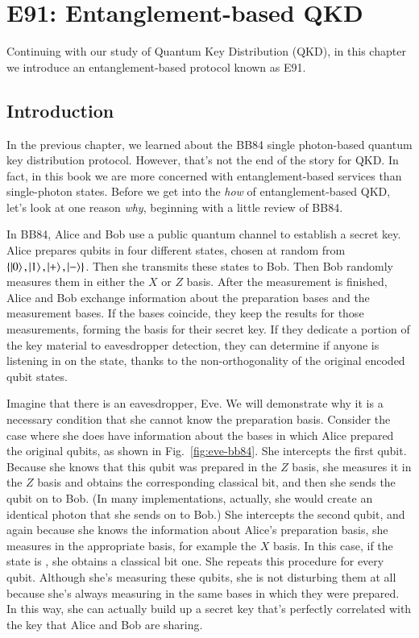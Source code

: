 \chapter{E91: Entanglement-based QKD}
\label{sec:10_E91}

Continuing with our study of Quantum Key Distribution (QKD), in this chapter we introduce an entanglement-based protocol known as E91.

\section{Introduction}


In the previous chapter, we learned about the BB84 single photon-based quantum key distribution protocol. However, that's not the end of the story for QKD.  In fact, in this book we are more concerned with entanglement-based services than single-photon states.  Before we get into the \emph{how} of entanglement-based QKD, let's look at one reason \emph{why}, beginning with a little review of BB84.

In BB84, Alice and Bob use a public quantum channel to establish a secret key.  Alice prepares qubits in four different states, chosen at random from $\{\left| 0 \right\rangle, \left| 1 \right\rangle, \left| + \right\rangle, \left| - \right\rangle\}$. Then she transmits these states to Bob. Then Bob randomly measures them in either the $X$ or $Z$ basis. After the measurement is finished, Alice and Bob exchange information about the preparation bases and the measurement bases. If the bases coincide, they keep the results for those measurements, forming the basis for their secret key. If they dedicate a portion of the key material to eavesdropper detection, they can determine if anyone is listening in on the state, thanks to the non-orthogonality of the original encoded qubit states.

Imagine that there is an eavesdropper, Eve. We will demonstrate why it is a necessary condition that she cannot know the preparation basis. Consider the case where she does have information about the bases in which Alice prepared the original qubits, as shown in Fig.~\ref{fig:eve-bb84}. She intercepts the first qubit. Because she knows that this qubit was prepared in the $Z$ basis, she measures it in the $Z$ basis and obtains the corresponding classical bit, and then she sends the qubit on to Bob. (In many implementations, actually, she would create an identical photon that she sends on to Bob.) She intercepts the second qubit, and again because she knows the information about Alice's preparation basis, she measures in the appropriate basis, for example the $X$ basis. In this case, if the state is \ket{-}, she obtains a classical bit one. She repeats this procedure for every qubit.
Although she's measuring these qubits, she is not disturbing them at all because she's always measuring in the same bases in which they were prepared. In this way, she can actually build up a secret key that's perfectly correlated with the key that Alice and Bob are sharing.

